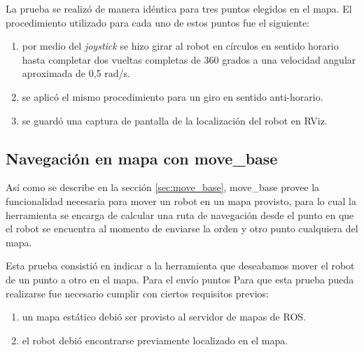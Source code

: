 La prueba se realizó de manera idéntica para tres puntos elegidos en el mapa. El procedimiento utilizado para cada uno de estos puntos fue el siguiente:

\begin{enumerate}
    \item por medio del \textit{joystick} se hizo girar al robot en círculos en sentido horario hasta completar dos vueltas completas de 360 grados a una velocidad angular aproximada de 0,5 rad/s.
    \item se aplicó el mismo procedimiento para un giro en sentido anti-horario.
    \item se guardó una captura de pantalla de la localización del robot en RViz.
\end{enumerate}



\subsection{Navegación en mapa con move\_base}

Así como se describe en la sección \ref{sec:move_base}, move\_base provee la funcionalidad necesaria para mover un robot en un mapa provisto, para lo cual la herramienta se encarga de calcular una ruta de navegación desde el punto en que el robot se encuentra al momento de enviarse la orden y otro punto cualquiera del mapa.

Esta prueba consistió en indicar a la herramienta que deseabamos mover el robot de un punto a otro en el mapa. Para el envío puntos  
Para que esta prueba pueda realizarse fue necesario cumplir con ciertos requisitos previos:

\begin{enumerate}
    \item un mapa estático debió ser provisto al servidor de mapas de ROS.
    \item el robot debió encontrarse previamente localizado en el mapa.
\end{enumerate}
